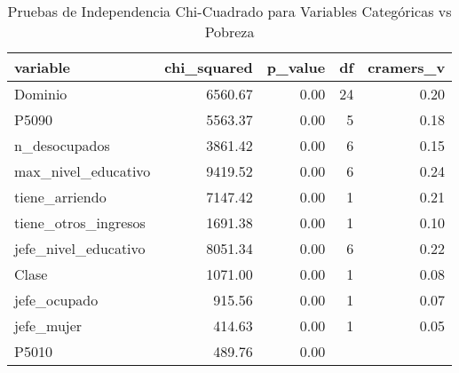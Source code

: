 \begin{table}[ht]
\centering
\begin{tabular}{lrrrr}
  \toprule
variable & chi\_squared & p\_value & df & cramers\_v \\ 
  \midrule
Dominio & 6560.67 & 0.00 &  24 & 0.20 \\ 
  P5090 & 5563.37 & 0.00 &   5 & 0.18 \\ 
  n\_desocupados & 3861.42 & 0.00 &   6 & 0.15 \\ 
  max\_nivel\_educativo & 9419.52 & 0.00 &   6 & 0.24 \\ 
  tiene\_arriendo & 7147.42 & 0.00 &   1 & 0.21 \\ 
  tiene\_otros\_ingresos & 1691.38 & 0.00 &   1 & 0.10 \\ 
  jefe\_nivel\_educativo & 8051.34 & 0.00 &   6 & 0.22 \\ 
  Clase & 1071.00 & 0.00 &   1 & 0.08 \\ 
  jefe\_ocupado & 915.56 & 0.00 &   1 & 0.07 \\ 
  jefe\_mujer & 414.63 & 0.00 &   1 & 0.05 \\ 
  P5010 & 489.76 & 0.00 &  &  \\ 
   \bottomrule
\end{tabular}
\caption{Pruebas de Independencia Chi-Cuadrado para Variables Categóricas vs Pobreza} 
\label{tab:chi_squared_tests}
\end{table}
